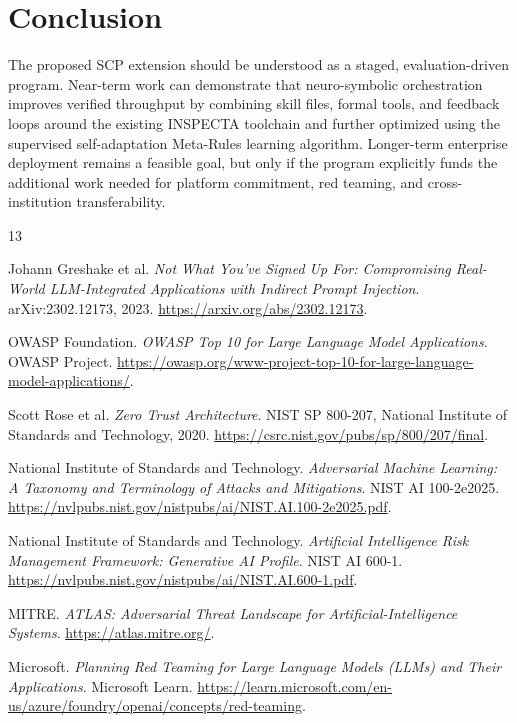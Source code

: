 \documentclass[11pt]{article}
\begin{document}
\section{Conclusion}

The proposed SCP extension should be understood as a staged, evaluation-driven program. Near-term work can demonstrate that neuro-symbolic orchestration improves verified throughput by combining skill files, formal tools, and feedback loops around the existing INSPECTA toolchain and further optimized using the supervised self-adaptation Meta-Rules learning algorithm. Longer-term enterprise deployment remains a feasible goal, but only if the program explicitly funds the additional work needed for platform commitment, red teaming, and cross-institution transferability.

\begin{thebibliography}{13}

Johann Greshake et al.
\newblock \emph{Not What You've Signed Up For: Compromising Real-World LLM-Integrated Applications with Indirect Prompt Injection}.
\newblock arXiv:2302.12173, 2023.
\newblock \url{https://arxiv.org/abs/2302.12173}.

OWASP Foundation.
\newblock \emph{OWASP Top 10 for Large Language Model Applications}.
\newblock OWASP Project.
\newblock \url{https://owasp.org/www-project-top-10-for-large-language-model-applications/}.

Scott Rose et al.
\newblock \emph{Zero Trust Architecture}.
\newblock NIST SP 800-207, National Institute of Standards and Technology, 2020.
\newblock \url{https://csrc.nist.gov/pubs/sp/800/207/final}.

National Institute of Standards and Technology.
\newblock \emph{Adversarial Machine Learning: A Taxonomy and Terminology of Attacks and Mitigations}.
\newblock NIST AI 100-2e2025.
\newblock \url{https://nvlpubs.nist.gov/nistpubs/ai/NIST.AI.100-2e2025.pdf}.

National Institute of Standards and Technology.
\newblock \emph{Artificial Intelligence Risk Management Framework: Generative AI Profile}.
\newblock NIST AI 600-1.
\newblock \url{https://nvlpubs.nist.gov/nistpubs/ai/NIST.AI.600-1.pdf}.

MITRE.
\newblock \emph{ATLAS: Adversarial Threat Landscape for Artificial-Intelligence Systems}.
\newblock \url{https://atlas.mitre.org/}.

Microsoft.
\newblock \emph{Planning Red Teaming for Large Language Models (LLMs) and Their Applications}.
\newblock Microsoft Learn.
\newblock \url{https://learn.microsoft.com/en-us/azure/foundry/openai/concepts/red-teaming}.


\end{thebibliography}
\end{document}
